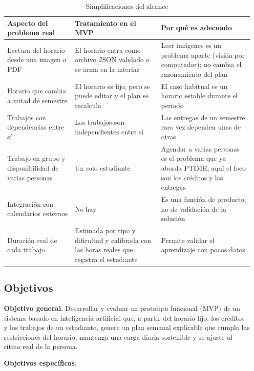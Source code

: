 \begin{table}[H]
\centering\small
\caption{Simplificaciones del alcance}\label{tab:simplificaciones}
\begin{tabularx}{\textwidth}{>{\raggedright\arraybackslash}p{4.2cm} >{\raggedright\arraybackslash}p{4.6cm} >{\raggedright\arraybackslash}X}
\toprule
Aspecto del problema real & Tratamiento en el MVP & Por qué es adecuado \\
\midrule
Lectura del horario desde una imagen o PDF & El horario entra como archivo JSON validado o se arma en la interfaz & Leer imágenes es un problema aparte (visión por computador); no cambia el razonamiento del plan \\
Horario que cambia a mitad de semestre & El horario es fijo, pero se puede editar y el plan se recalcula & El caso habitual es un horario estable durante el periodo \\
Trabajos con dependencias entre sí & Los trabajos son independientes entre sí & Las entregas de un semestre rara vez dependen unas de otras \\
Trabajo en grupo y disponibilidad de varias personas & Un solo estudiante & Agendar a varias personas es el problema que ya aborda PTIME; aquí el foco son los créditos y las entregas \\
Integración con calendarios externos & No hay & Es una función de producto, no de validación de la solución \\
Duración real de cada trabajo & Estimada por tipo y dificultad y calibrada con las horas reales que registra el estudiante & Permite validar el aprendizaje con pocos datos \\
\bottomrule
\end{tabularx}
\end{table}

\subsection{Objetivos}

\textbf{Objetivo general.} Desarrollar y evaluar un prototipo funcional (MVP) de un sistema basado en inteligencia artificial que, a partir del horario fijo, los créditos y los trabajos de un estudiante, genere un plan semanal explicable que cumpla las restricciones del horario, mantenga una carga diaria sostenible y se ajuste al ritmo real de la persona.

\textbf{Objetivos específicos.}

